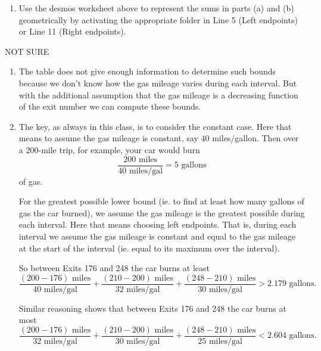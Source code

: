 \documentclass{ximera}
\begin{document}
\begin{exercise}
\begin{enumerate}
\item Use the desmos worksheet above to represent the sums in parts (a) and (b) geometrically by activating the appropriate folder in Line 5 (Left endpoints) or Line 11 (Right endpoints).  %
\end{enumerate}

NOT SURE


\begin{enumerate}
\item The table does not give enough information to determine such bounds because we don't know how the gas mileage varies during each interval. But with the additional assumption that the gas mileage is a decreasing function of the exit number we can compute these bounds.

\item The key, as always in this class, is to consider the constant case. Here that means to assume the gas mileage is constant, say $40$ miles/gallon. Then over a $200$-mile trip, for example, your car would burn
\[
      \frac{200 \text{ miles}}{40 \text{ miles/gal}} = 5\text{ gallons}
\]
of gas. 

For the greatest possible lower bound (ie. to find at least how many gallons of gas the car burned), we assume the gas mileage is the greatest possible during each interval. Here that means choosing left endpoints. That is, during each interval we assume the gas mileage is constant and equal to the gas mileage at the start of the interval (ie. equal to its maximum over the interval).

So between Exits 176 and 248 the car burns at least
\[
   \frac{(200-176) \text{ miles}}{40 \text{ miles/gal}} +  \frac{(210 - 200) \text{ miles}}{32 \text{ miles/gal}} + \frac{(248 - 210) \text{ miles}}{30 \text{ miles/gal}} > 2.179 \text{ gallons}.
\] 

Similar reasoning shows that between Exits 176 and 248 the car burns at most
\[
   \frac{(200-176) \text{ miles}}{32 \text{ miles/gal}} +  \frac{(210 - 200) \text{ miles}}{30 \text{ miles/gal}} + \frac{(248 - 210) \text{ miles}}{25 \text{ miles/gal}} < 2.604 \text{ gallons}.
\] 

\end{enumerate}


\end{exercise}
\end{document}
